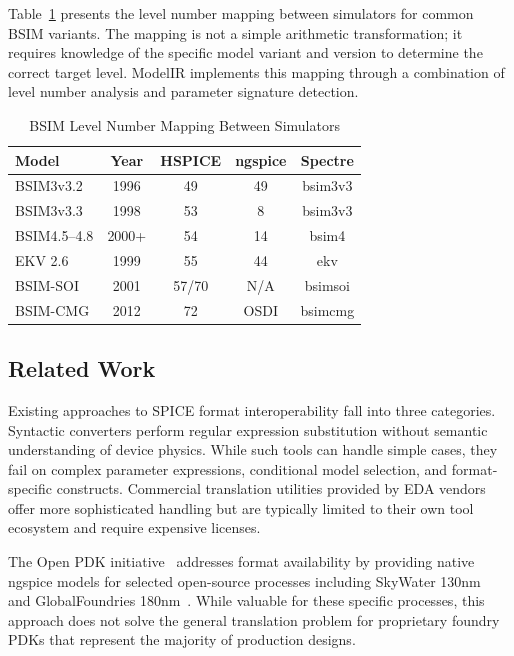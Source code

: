 \documentclass[conference]{IEEEtran}
\begin{document}
Table~\ref{tab:bsim_levels} presents the level number mapping between simulators for common BSIM variants. The mapping is not a simple arithmetic transformation; it requires knowledge of the specific model variant and version to determine the correct target level. ModelIR implements this mapping through a combination of level number analysis and parameter signature detection.

\begin{table}[!t]
\caption{BSIM Level Number Mapping Between Simulators}
\label{tab:bsim_levels}
\centering
\renewcommand{\arraystretch}{1.15}
\begin{tabular}{@{}lcccc@{}}
\toprule
\textbf{Model} & \textbf{Year} & \textbf{HSPICE} & \textbf{ngspice} & \textbf{Spectre} \\
\midrule
BSIM3v3.2 & 1996 & 49 & 49 & bsim3v3 \\
BSIM3v3.3 & 1998 & 53 & 8 & bsim3v3 \\
BSIM4.5--4.8 & 2000+ & 54 & 14 & bsim4 \\
EKV 2.6 & 1999 & 55 & 44 & ekv \\
BSIM-SOI & 2001 & 57/70 & N/A & bsimsoi \\
BSIM-CMG & 2012 & 72 & OSDI & bsimcmg \\
\bottomrule
\end{tabular}
\end{table}

\subsection{Related Work}

Existing approaches to SPICE format interoperability fall into three categories. Syntactic converters perform regular expression substitution without semantic understanding of device physics. While such tools can handle simple cases, they fail on complex parameter expressions, conditional model selection, and format-specific constructs. Commercial translation utilities provided by EDA vendors offer more sophisticated handling but are typically limited to their own tool ecosystem and require expensive licenses.

The Open PDK initiative~\cite{openpdk} addresses format availability by providing native ngspice models for selected open-source processes including SkyWater 130nm~\cite{skywater} and GlobalFoundries 180nm~\cite{gf180}. While valuable for these specific processes, this approach does not solve the general translation problem for proprietary foundry PDKs that represent the majority of production designs.
\end{document}
